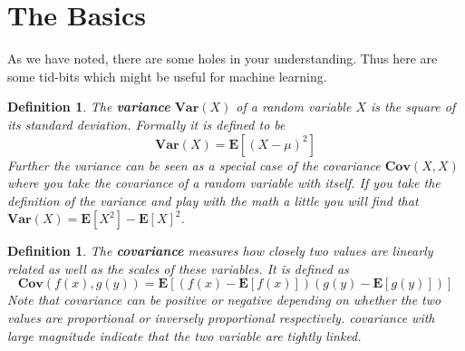 \documentclass[twoside]{article}
\newtheorem{definition}[theorem]{Definition}
\newcommand\Var{\mathbf{Var}}
\newcommand\E{\mathbf{E}}
\newcommand\Cov{\mathbf{Cov}}
\begin{document}
\section{The Basics}
As we have noted, there are some holes in your understanding. Thus here are some tid-bits which might be useful for machine learning.

\begin{definition}
The \textbf{variance} $\Var (X)$ of a random variable $X$ is the square of its standard deviation. Formally it is defined to be 
\[\Var(X) = \E[(X - \mu)^2]\]
Further the variance can be seen as a special case of the covariance $\Cov (X, X)$ where you take the covariance of a random variable with itself. If you take the definition of the variance and play with the math a little you will find that $\Var(X) = \E[X^2] - \E[X]^2$.
\end{definition}
 
\begin{definition}
The \textbf{covariance} measures how closely two values are linearly related as well as the scales of these variables. It is defined as 
\[\Cov(f(x), g(y)) = \E[(f(x) - \E[f(x)])(g(y) - \E[g(y)])]\]
Note that covariance can be positive or negative depending on whether the two values are proportional or inversely proportional respectively. covariance with large magnitude indicate that the two variable are tightly linked. 
\end{definition} 
 
\end{document}
